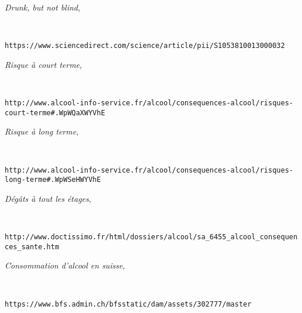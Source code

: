 \documentclass[a4paper, 12pt]{extarticle}
\begin{document}
	\begin{thebibliography}{9}
		 \emph{Drunk, but not blind}, \begin{scriptsize}\end{scriptsize}\\
    \begin{scriptsize}\texttt{https://www.sciencedirect.com/science/article/pii/S1053810013000032 }\end{scriptsize}

     \emph{Risque à court terme}, \begin{scriptsize}[article]\end{scriptsize}\\
    \begin{scriptsize}\texttt{http://www.alcool-info-service.fr/alcool/consequences-alcool/risques-court-terme\#.WpWQaXWYVhE} \end{scriptsize}

     \emph{Risque à long terme}, \begin{scriptsize}[article]\end{scriptsize}\\
    \begin{scriptsize}\texttt{http://www.alcool-info-service.fr/alcool/consequences-alcool/risques-long-terme\#.WpWSeHWYVhE} \end{scriptsize}

     \emph{Dégâts à tout les étages}, \begin{scriptsize}[article]\end{scriptsize}\\
    \begin{scriptsize}\texttt{http://www.doctissimo.fr/html/dossiers/alcool/sa\_6455\_alcool\_consequences\_sante.htm} \end{scriptsize}

     \emph{Consommation d'alcool en suisse}, \begin{scriptsize}[xls]\end{scriptsize}\\
    \begin{scriptsize}\texttt{https://www.bfs.admin.ch/bfsstatic/dam/assets/302777/master} \end{scriptsize}

	\end{thebibliography}
\end{document}
